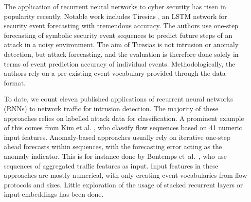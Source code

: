 \documentclass[a4paper,12pt,twoside]{article}
\begin{document}
The application of recurrent neural networks to cyber security %
has risen in popularity recently. 
Notable work includes Tiresias \cite{shen2018tiresias}, an LSTM network for security event forecasting with tremendous accuracy. The authors use one-step forecasting of symbolic security event sequences to predict future steps of an attack in a noisy environment. 
The aim of Tiresias is not intrusion or anomaly detection, but attack forecasting, and the evaluation is therefore done solely in terms of event prediction accuracy of individual events. 
Methodologically, the authors rely on a pre-existing event vocabulary provided through the data format.%


To date, we count eleven published applications of recurrent neural networks (RNNs) to network traffic for intrusion detection. The majority of these approaches  relies on labelled attack data for classification.%
A prominent example of this comes from Kim et al. \cite{kim2016long}, who classify flow sequences based on 41 numeric input features.
Anomaly-based approaches usually rely on iterative one-step ahead forecasts within sequences, with the forecasting error acting as the anomaly indicator. This is for instance done by Bontemps et~al.~\cite{Bontemps2016}, who use sequences of aggregated traffic features as input. Input features in these approaches are mostly numerical, with only \cite{radford2018network} creating event vocabularies from flow protocols and sizes.
Little exploration of the usage of stacked recurrent layers or input embeddings has been done.

\end{document}
